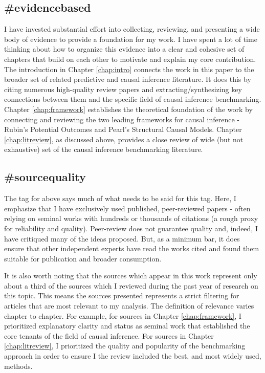 \documentclass[./main.tex]{subfiles}
\begin{document}

\subsection*{\textbf{\#evidencebased}}
\label{hc:evidencebased}

I have invested substantial effort into collecting, reviewing, and presenting a wide body of evidence to provide a foundation for my work. I have spent a lot of time thinking about how to organize this evidence into a clear and cohesive set of chapters that build on each other to motivate and explain my core contribution. The introduction in Chapter \ref{chap:intro} connects the work in this paper to the broader set of related predictive and causal inference literature. It does this by citing numerous high-quality review papers and extracting/synthesizing key connections between them and the specific field of causal inference benchmarking. Chapter \ref{chap:framework} establishes the theoretical foundation of the work by connecting and reviewing the two leading frameworks for causal inference - Rubin's Potential Outcomes and Pearl's Structural Causal Models. Chapter \ref{chap:litreview}, as discussed above, provides a close review of wide (but not exhaustive) set of the causal inference benchmarking literature.


\subsection*{\textbf{\#sourcequality}}
\label{hc:sourcequality}

The tag for  above says much of what needs to be said for this tag. Here, I emphasize that I have exclusively used published, peer-reviewed papers - often relying on seminal works with hundreds or thousands of citations (a rough proxy for reliability and quality). Peer-review does not guarantee quality and, indeed, I have critiqued many of the ideas proposed. But, as a minimum bar, it does ensure that other independent experts have read the works cited and found them suitable for publication and broader consumption.

\vspace{\baselineskip}

It is also worth noting that the sources which appear in this work represent only about a third of the sources which I reviewed during the past year of research on this topic. This means the sources presented represents a strict filtering for articles that are most relevant to my analysis. The definition of relevance varies chapter to chapter. For example, for sources in Chapter \ref{chap:framework}, I prioritized explanatory clarity and status as seminal work that established the core tenants of the field of causal inference. For sources in Chapter \ref{chap:litreview}, I prioritized the quality and popularity of the benchmarking approach in order to ensure I the review included the best, and most widely used, methods.
\end{document}
